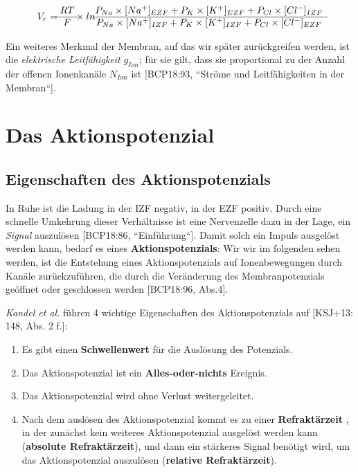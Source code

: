 {{\begin{equation}
V_{r} = \begin{matrix} RT \\ \hline F \end{matrix}  \times ln \begin{matrix}
  P_{Na} \space  \times \space [Na^+]_{EZF} \space + \space P_{K} \space  \times \space [K^+]_{EZF} \space + \space P_{Cl} \space  \times \space [Cl^-]_{IZF}  \\ \hline
  P_{Na} \space  \times [Na^+]_{IZF} \space + \space P_{K} \space  \times \space [K^+]_{IZF} \space + \space P_{Cl} \space  \times \space [Cl^-]_{EZF}
\end{matrix}
\label{eq:gl-goldman}
\end{equation}

Ein weiteres Merkmal der Membran, auf das wir später zurückgreifen werden, ist die \textit{elektrische Leitfähigkeit} $g_{Ion}$; für sie gilt, dass sie proportional zu der Anzahl der offenen Ionenkanäle $N_{Ion}$ ist [BCP18:93, ``Ströme und Leitfähigkeiten in der Membran``].

\section{Das Aktionspotenzial}

\subsection{Eigenschaften des Aktionspotenzials}

In Ruhe ist die Ladung in der IZF negativ, in der EZF positiv.
Durch eine schnelle Umkehrung dieser Verhältnisse ist eine Nervenzelle dazu in der Lage, ein \textit{Signal} auszulösen [BCP18:86, ``Einführung``].
Damit solch ein Impuls ausgelöst werden kann, bedarf es eines \textbf{Aktionspotenzials}: Wir wir im folgenden sehen werden, ist die Entstehung eines Aktionspotenzials auf Ionenbewegungen durch Kanäle zurückzuführen, die durch die Veränderung des Membranpotenzials geöffnet oder geschlossen werden [BCP18:96, Abs.4].

 \textit{Kandel et al.} führen 4 wichtige Eigenschaften des Aktionspotenzials auf [KSJ+13: 148, Abs. 2 f.]:
\begin{enumerate}
 \item Es gibt einen \textbf{Schwellenwert} für die Auslösung des Potenzials.
 \item Das Aktionspotenzial ist ein \textbf{Alles-oder-nichts} Ereignis.
 \item Das Aktionspotenzial wird ohne Verlust weitergeleitet.
 \item Nach dem auslösen des Aktionspotenzial kommt es zu einer \textbf{Refraktärzeit} , in der zunächst kein weiteres Aktionspotenzial ausgelöst werden kann (\textbf{absolute Refraktärzeit}), und dann ein stärkeres Signal benötigt wird, um das Aktionspotenzial auszulösen (\textbf{relative Refraktärzeit}).
\end{enumerate}


}}
